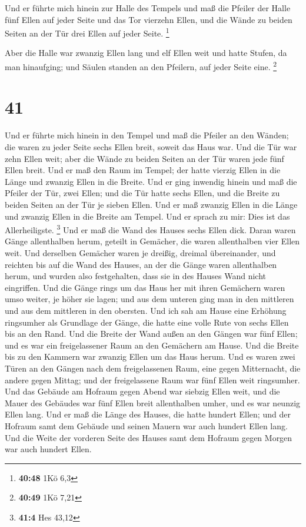  Und er führte mich hinein zur Halle des Tempels und maß
die Pfeiler der Halle fünf Ellen auf jeder Seite und das Tor vierzehn
Ellen, und die Wände zu beiden Seiten an der Tür drei Ellen auf jeder
Seite. \footnote{\textbf{40:48} 1Kö 6,3}

 Aber die Halle war zwanzig Ellen lang und elf Ellen weit
und hatte Stufen, da man hinaufging; und Säulen standen an den Pfeilern,
auf jeder Seite eine. \footnote{\textbf{40:49} 1Kö 7,21}

\hypertarget{section-13}{%
\section{41}\label{section-13}}

 Und er führte mich hinein in den Tempel und maß die
Pfeiler an den Wänden; die waren zu jeder Seite sechs Ellen breit,
soweit das Haus war.  Und die Tür war zehn Ellen weit;
aber die Wände zu beiden Seiten an der Tür waren jede fünf Ellen breit.
Und er maß den Raum im Tempel; der hatte vierzig Ellen in die Länge und
zwanzig Ellen in die Breite.  Und er ging inwendig hinein
und maß die Pfeiler der Tür, zwei Ellen; und die Tür hatte sechs Ellen,
und die Breite zu beiden Seiten an der Tür je sieben Ellen.
 Und er maß zwanzig Ellen in die Länge und zwanzig Ellen
in die Breite am Tempel. Und er sprach zu mir: Dies ist das
Allerheiligste. \footnote{\textbf{41:4} Hes 43,12}  Und er
maß die Wand des Hauses sechs Ellen dick. Daran waren Gänge allenthalben
herum, geteilt in Gemächer, die waren allenthalben vier Ellen weit.
 Und derselben Gemächer waren je dreißig, dreimal
übereinander, und reichten bis auf die Wand des Hauses, an der die Gänge
waren allenthalben herum, und wurden also festgehalten, dass sie in des
Hauses Wand nicht eingriffen.  Und die Gänge rings um das
Haus her mit ihren Gemächern waren umso weiter, je höher sie lagen; und
aus dem unteren ging man in den mittleren und aus dem mittleren in den
obersten.  Und ich sah am Hause eine Erhöhung ringsumher
als Grundlage der Gänge, die hatte eine volle Rute von sechs Ellen bis
an den Rand.  Und die Breite der Wand außen an den Gängen
war fünf Ellen; und es war ein freigelassener Raum an den Gemächern am
Hause.  Und die Breite bis zu den Kammern war zwanzig
Ellen um das Haus herum.  Und es waren zwei Türen an den
Gängen nach dem freigelassenen Raum, eine gegen Mitternacht, die andere
gegen Mittag; und der freigelassene Raum war fünf Ellen weit ringsumher.
 Und das Gebäude am Hofraum gegen Abend war siebzig Ellen
weit, und die Mauer des Gebäudes war fünf Ellen breit allenthalben
umher, und es war neunzig Ellen lang.  Und er maß die
Länge des Hauses, die hatte hundert Ellen; und der Hofraum samt dem
Gebäude und seinen Mauern war auch hundert Ellen lang. 
Und die Weite der vorderen Seite des Hauses samt dem Hofraum gegen
Morgen war auch hundert Ellen.

